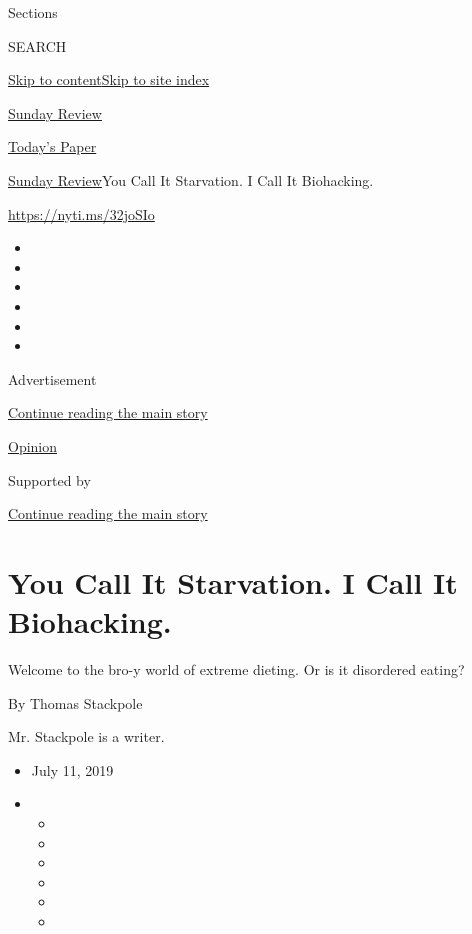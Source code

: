 Sections

SEARCH

\protect\hyperlink{site-content}{Skip to
content}\protect\hyperlink{site-index}{Skip to site index}

\href{https://www.nytimes3xbfgragh.onion/section/opinion/sunday}{Sunday
Review}

\href{https://myaccount.nytimes3xbfgragh.onion/auth/login?response_type=cookie\&client_id=vi}{}

\href{https://www.nytimes3xbfgragh.onion/section/todayspaper}{Today's
Paper}

\href{/section/opinion/sunday}{Sunday Review}\textbar{}You Call It
Starvation. I Call It Biohacking.

\url{https://nyti.ms/32joSIo}

\begin{itemize}
\item
\item
\item
\item
\item
\item
\end{itemize}

Advertisement

\protect\hyperlink{after-top}{Continue reading the main story}

\href{/section/opinion}{Opinion}

Supported by

\protect\hyperlink{after-sponsor}{Continue reading the main story}

\hypertarget{you-call-it-starvation-i-call-it-biohacking}{%
\section{You Call It Starvation. I Call It
Biohacking.}\label{you-call-it-starvation-i-call-it-biohacking}}

Welcome to the bro-y world of extreme dieting. Or is it disordered
eating?

By Thomas Stackpole

Mr. Stackpole is a writer.

\begin{itemize}
\item
  July 11, 2019
\item
  \begin{itemize}
  \item
  \item
  \item
  \item
  \item
  \item
  \end{itemize}
\end{itemize}

